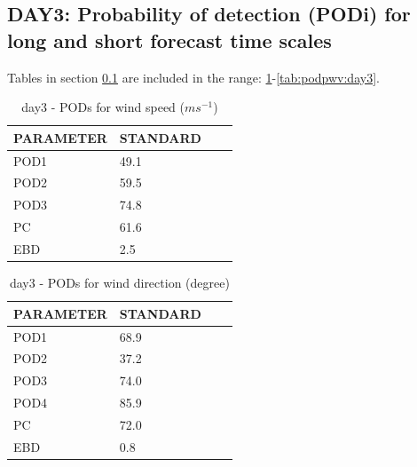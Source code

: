 \subsection{DAY3: Probability of detection (PODi) for long and short forecast time scales}\label{subsec:day3:pod}
Tables in section \ref{subsec:day3:pod} are included in the range: \ref{tab:podws:day3}-\ref{tab:podpwv:day3}.
\begin{table}[h!]
\begin{center}
\begin{tabular}{|l|l|l|l|}
\hline
\multicolumn{1}{|c|}{\cellcolor[HTML]{C0C0C0}\textbf{PARAMETER}} & \multicolumn{1}{c|}{\cellcolor[HTML]{C0C0C0}\textbf{STANDARD}} \\
\hline
\cellcolor[HTML]{C0C0C0}POD1  & 49.1                                \\
\cellcolor[HTML]{C0C0C0}POD2  & 59.5                                \\
\cellcolor[HTML]{C0C0C0}POD3  & 74.8                                \\
\cellcolor[HTML]{C0C0C0}PC    & 61.6                                  \\
\cellcolor[HTML]{C0C0C0}EBD   & 2.5                                 \\
\hline
\end{tabular}
\caption{day3 - PODs for wind speed ($m s^{-1}$)}
\label{tab:podws:day3}
\end{center}
\end{table}
\begin{table}[p!]
\begin{center}
\begin{tabular}{|l|l|l|l|}
\hline
\multicolumn{1}{|c|}{\cellcolor[HTML]{C0C0C0}\textbf{PARAMETER}} & \multicolumn{1}{c|}{\cellcolor[HTML]{C0C0C0}\textbf{STANDARD}}\\
\hline
\cellcolor[HTML]{C0C0C0}POD1  & 68.9      \\
\cellcolor[HTML]{C0C0C0}POD2  & 37.2      \\
\cellcolor[HTML]{C0C0C0}POD3  & 74.0      \\
\cellcolor[HTML]{C0C0C0}POD4  & 85.9      \\
\cellcolor[HTML]{C0C0C0}PC    & 72.0        \\
\cellcolor[HTML]{C0C0C0}EBD   & 0.8       \\
\hline
\end{tabular}
\caption{day3 - PODs for wind direction (degree)}
\label{tab:podwd:day3}
\end{center}
\end{table}

